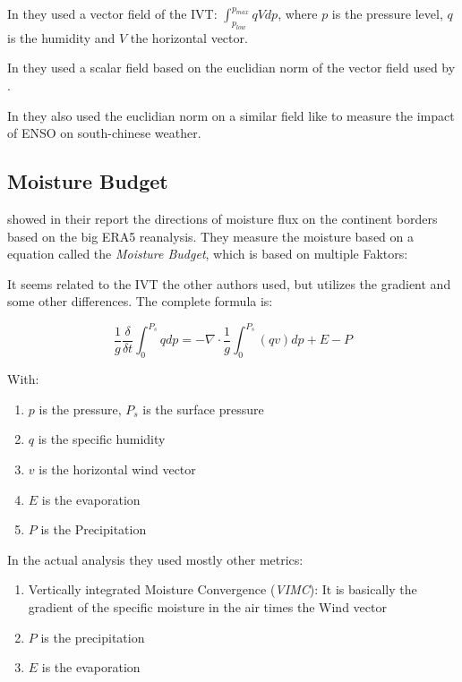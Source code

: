 In \cite{ralph_dropsonde_2017} they used a vector field of the IVT: $\int_{p_{low}}^{p_{max}} qV dp$, where $p$ is the pressure level, $q$ is the humidity and $V$ the horizontal vector.

In \cite{sousa_north_2020} they used a scalar field based on the euclidian norm of the vector field used by \cite{ralph_dropsonde_2017}.


In \cite{ayantobo_integrated_2022} they also used the euclidian norm on a similar field like \cite{ralph_dropsonde_2017} to measure the impact of  ENSO on south-chinese weather.

\subsection{Moisture Budget}

\citeauthor{yang_moisture_2022} showed in their report \cite{yang_moisture_2022} the directions of moisture flux on the continent borders based on the big ERA5 reanalysis.
They measure the moisture based on a equation called the \textit{Moisture Budget}, which is based on multiple Faktors: 



It seems related to the IVT the other authors used, but utilizes the gradient and some other differences. The complete formula is:

$$
\frac{1}{g} \frac{\delta}{\delta t} \int^{P_s}_0 q dp = - \nabla \cdot \frac{1}{g} \int^{P_s}_0 (qv) dp + E - P
$$

With: 

\begin{enumerate}
  \item $p$ is the pressure, $P_s$ is the surface pressure
  \item $q$ is the specific humidity
  \item $v$ is the horizontal wind vector
  \item $E$ is the evaporation
  \item $P$ is the Precipitation
\end{enumerate}


In the actual analysis they used mostly other metrics:


\begin{enumerate}
  \item Vertically integrated Moisture Convergence (\textit{VIMC}): It is basically the gradient of the specific moisture in the air times the Wind vector
  \item $P$ is the precipitation 
  \item $E$ is the evaporation
\end{enumerate}

